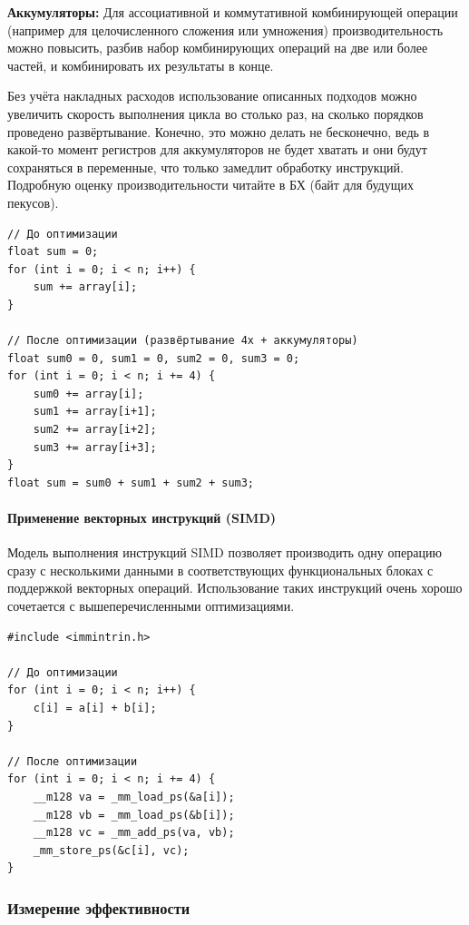 \documentclass[12pt,a4paper]{article}
\begin{document}
\textbf{Аккумуляторы: } Для ассоциативной и коммутативной комбинирующей операции (например для целочисленного сложения или умножения) производительность можно повысить, разбив набор комбинирующих операций на две или более частей, и комбинировать их результаты в конце. 

Без учёта накладных расходов использование описанных подходов можно увеличить скорость выполнения цикла во столько раз, на сколько порядков проведено развёртывание. Конечно, это можно делать не бесконечно, ведь в какой-то момент регистров для аккумуляторов не будет хватать и они будут сохраняться в переменные, что только замедлит обработку инструкций. Подробную оценку производительности читайте в БХ (байт для будущих пекусов).

\begin{verbatim}
// До оптимизации
float sum = 0;
for (int i = 0; i < n; i++) {
    sum += array[i];
}

// После оптимизации (развёртывание 4x + аккумуляторы)
float sum0 = 0, sum1 = 0, sum2 = 0, sum3 = 0;
for (int i = 0; i < n; i += 4) {
    sum0 += array[i];
    sum1 += array[i+1];
    sum2 += array[i+2];
    sum3 += array[i+3];
}
float sum = sum0 + sum1 + sum2 + sum3;
\end{verbatim}

\paragraph{Применение векторных инструкций (SIMD)}

Модель выполнения инструкций SIMD позволяет производить одну операцию сразу с несколькими данными в соответствующих функциональных блоках с поддержкой векторных операций. Использование таких инструкций очень хорошо сочетается с вышеперечисленными оптимизациями.

\begin{verbatim}
#include <immintrin.h>

// До оптимизации
for (int i = 0; i < n; i++) {
    c[i] = a[i] + b[i];
}

// После оптимизации
for (int i = 0; i < n; i += 4) {
    __m128 va = _mm_load_ps(&a[i]);
    __m128 vb = _mm_load_ps(&b[i]);
    __m128 vc = _mm_add_ps(va, vb);
    _mm_store_ps(&c[i], vc);
}
\end{verbatim}

\subsubsection{Измерение эффективности}
\end{document}
